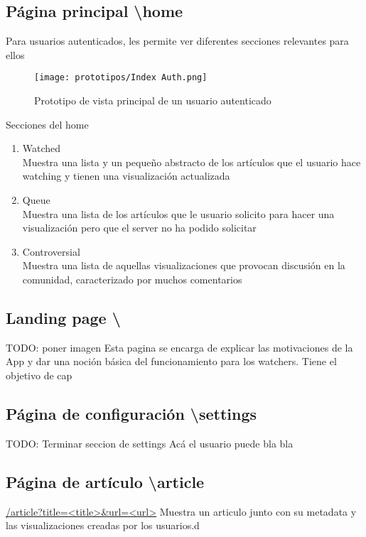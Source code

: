 \subsection{Página principal \textbackslash home}
Para usuarios autenticados, les permite ver diferentes secciones relevantes para ellos

\begin{figure}[H]
    \centering
    \texttt{[image: prototipos/Index Auth.png]}
    \caption{Prototipo de vista principal de un usuario autenticado}
    \label{PrototipoHomePage}
\end{figure}


Secciones del home
\begin{enumerate}
    \item Watched \\ Muestra una lista y un pequeño abstracto de los artículos que el usuario hace watching y tienen una visualización actualizada
    \item Queue \\ Muestra una lista de los artículos que le usuario solicito para hacer una visualización pero que el server no ha podido solicitar
    \item Controversial \\ Muestra una lista de aquellas visualizaciones que provocan discusión en la comunidad, caracterizado por muchos comentarios
\end{enumerate}

\subsection{Landing page \textbackslash}
TODO: poner imagen
Esta pagina se encarga de explicar las motivaciones de la App y dar una noción básica del funcionamiento para los watchers.
Tiene el objetivo de cap

\subsection{Página de configuración \textbackslash settings}
TODO: Terminar seccion de settings
Acá el usuario puede bla bla

\subsection{Página de artículo \textbackslash article}
\url{/article?title=<title>&url=<url>}
Muestra un articulo junto con su metadata y las visualizaciones creadas por los usuarios.d

